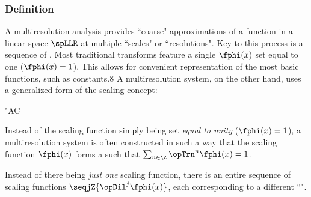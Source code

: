 \subsubsection{Definition}
A multiresolution analysis provides ``coarse" approximations of a function in a linear space $\spLLR$ at multiple
``scales" or ``resolutions".
Key to this process is a sequence of .
Most traditional transforms feature a single  $\fphi(x)$
set equal to one ($\fphi(x)=1$).
This allows for convenient representation of the most basic functions, such as constants.\citep{jawerth}{8}
A multiresolution system, on the other hand, uses a generalized form of the scaling concept:
\begin{dingautolist}{"AC}
  \item Instead of the scaling function simply being set \emph{equal to unity} ($\fphi(x)=1$),
        a multiresolution system  is often constructed in such a way that the scaling function 
        $\fphi(x)$ forms a   such that
        $\sum_{n\in\Z} \opTrn^n\fphi(x) = 1$.
  \item Instead of there being \emph{just one} scaling function, there
        is an entire sequence of scaling functions $\seqjZ{\opDil^j\fphi(x)}$, 
        each corresponding to a different ``".
\end{dingautolist}

